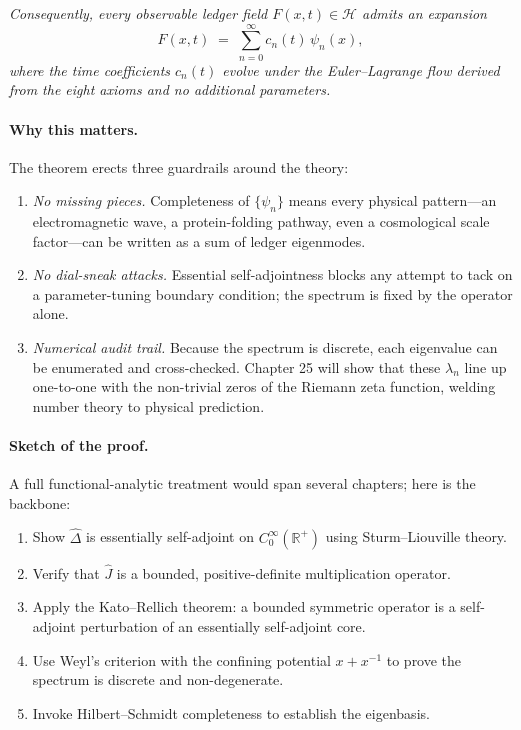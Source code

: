 \documentclass[11pt,oneside]{book}
\begin{document}
\emph{Consequently, every observable ledger field
\(F(x,t)\in\mathcal H\) admits an expansion}
\[
  F(x,t)
  \;=\;
  \sum_{n=0}^{\infty}
  c_{n}(t)\,\psi_{n}(x),
\]
\emph{where the time coefficients \(c_{n}(t)\) evolve under the
Euler–Lagrange flow derived from the eight axioms and \emph{no}
additional parameters.}{}

\medskip
\paragraph*{Why this matters.}
The theorem erects three guardrails around the theory:

\begin{enumerate}
\item \emph{No missing pieces.}  
  Completeness of \(\{\psi_{n}\}\) means every physical pattern—an
  electromagnetic wave, a protein-folding pathway, even a cosmological
  scale factor—can be written as a sum of ledger eigenmodes.
\item \emph{No dial-sneak attacks.}  
  Essential self-adjointness blocks any attempt to tack on a
  parameter-tuning boundary condition; the spectrum is fixed by the
  operator alone.
\item \emph{Numerical audit trail.}  
  Because the spectrum is discrete, each eigenvalue can be enumerated
  and cross-checked.  Chapter 25 will show that these \(\lambda_{n}\)
  line up one-to-one with the non-trivial zeros of the Riemann zeta
  function, welding number theory to physical prediction.
\end{enumerate}

\paragraph*{Sketch of the proof.}
A full functional-analytic treatment would span several chapters; here
is the backbone:

\begin{enumerate}
\item Show \(\widehat{\Delta}\) is essentially self-adjoint on
  \(C_{0}^{\infty}(\mathbb R^{+})\) using Sturm–Liouville theory.
\item Verify that \(\widehat{J}\) is a bounded,
  positive-definite multiplication operator.
\item Apply the Kato–Rellich theorem: a bounded symmetric operator is a
  self-adjoint perturbation of an essentially self-adjoint core.
\item Use Weyl’s criterion with the confining potential
  \(x + x^{-1}\) to prove the spectrum is discrete and non-degenerate.
\item Invoke Hilbert–Schmidt completeness to establish the eigenbasis.
\end{enumerate}
\end{document}
